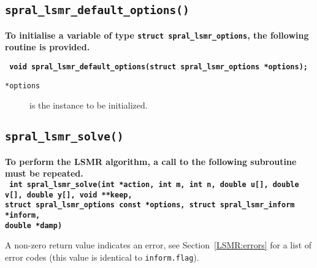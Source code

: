 \subsection{\texttt{spral\_lsmr\_default\_options()}}
\textbf{To initialise a variable of type \texttt{struct spral\_lsmr\_options},
the following routine is provided.}

\vspace*{0.1cm}
\noindent
\textbf{\texttt{
   \hspace*{0.3cm} void spral\_lsmr\_default\_options(struct spral\_lsmr\_options *options);
}}

\noindent
\begin{description}
   \item[\texttt{*options}] is the instance to be initialized.
\end{description}

\subsection{\texttt{spral\_lsmr\_solve()}}
\textbf{
   To perform the LSMR algorithm, a call to the following subroutine must be
   repeated.
   \vspace{0.2cm}\\
   \texttt{
      \hspace*{0.2cm} int spral\_lsmr\_solve(int *action, int m, int n, double u[], double v[], double y[], void **keep,\\
      \hspace*{0.7cm} struct spral\_lsmr\_options const *options, struct spral\_lsmr\_inform *inform,\\
      \hspace*{0.7cm} double *damp)
   }
}

\vspace{0.1cm}
\noindent
A non-zero return value indicates an error, see Section~\ref{LSMR:errors} for a
list of error codes (this value is identical to \texttt{inform.flag}).

